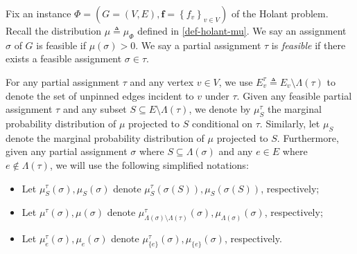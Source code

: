 \documentclass[11pt]{article}
\newcommand{\set}[1]{\left\{#1\right\}}
\newcommand{\defeq}{\triangleq} \renewcommand{\d}{\,\-d}
\newcommand{\vecf}{\boldsymbol{f}}
\newcommand{\hktodo}[1]{{\color{blue}{#1}}}
\begin{document}
Fix an instance $ \Phi = \left(G = (V, E), \vecf = \set{f_v}_{v \in V}\right)$ of the Holant problem.
Recall the distribution $\mu \triangleq \mu_{\Phi}$ defined in \eqref{def-holant-mu}.
We say an assignment $\sigma$ of $G$ is feasible if $\mu(\sigma)>0$. 
We say a partial assignment $\tau$ is \emph{feasible} if there exists a feasible assignment $\sigma\in \tau$.




 



For any partial assignment $\tau$ and any vertex $v\in V$, we use $E_v^\tau \defeq E_v \setminus \Lambda(\tau)$ to denote the set of unpinned edges incident to $v$ under $\tau$. 
Given any feasible partial assignment $\tau$ and any subset $S \subseteq E \setminus \Lambda(\tau)$, we denote by $\mu_S^\tau$ the marginal probability distribution of $\mu$ projected to $S$ conditional on $\tau$.
Similarly, let $\mu_S$ denote the marginal probability distribution of $\mu$ projected to $S$.
Furthermore, given any partial assignment $\sigma$ where $S\subseteq \Lambda(\sigma)$ and any $e\in E$ where $e\not\in \Lambda(\tau)$, we will use the following simplified notations:
\begin{itemize}
\item Let $\mu_S^\tau(\sigma),\mu_S(\sigma)$ denote $\mu_S^\tau(\sigma(S)),\mu_S(\sigma(S))$, respectively;
\item Let $\mu^\tau(\sigma),\mu(\sigma)$ denote $\mu_{\Lambda(\sigma)\setminus\Lambda(\tau)}^\tau(\sigma),\mu_{\Lambda(\sigma)}(\sigma)$, respectively;
\item Let $\mu_e^\tau(\sigma),\mu_e(\sigma)$ denote $\mu_{\{e\}}^\tau(\sigma),\mu_{\{e\}}(\sigma)$, respectively.
\end{itemize}
\end{document}
